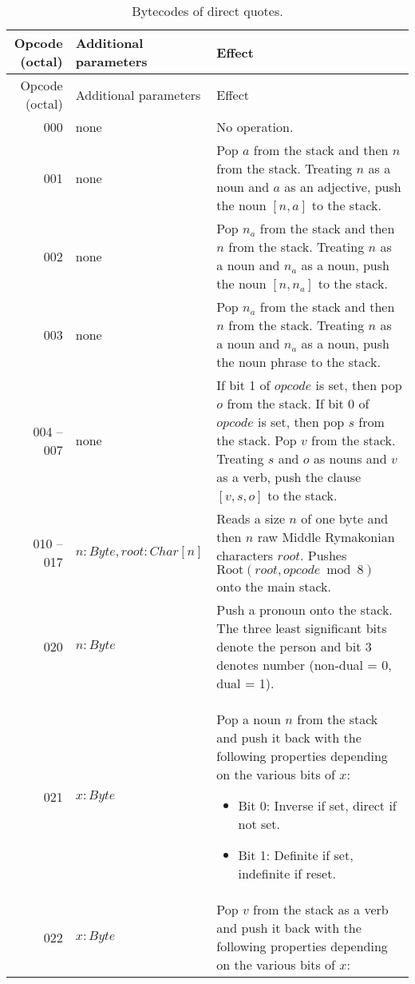 \documentclass{book}
\newcommand{\lname}{Middle Rymakonian}
\begin{document}
\begin{longtabu}[c]{r|l|Y}
    \caption{Bytecodes of direct quotes.} \\
    
    Opcode (octal) & Additional parameters & Effect \\
    \hline
    \endfirsthead
    
    Opcode (octal) & Additional parameters & Effect \\
    \hline
    \endhead
    
    \endfoot
    
    \endlastfoot

    000 & none & No operation. \\
    001 & none & Pop $a$ from the stack and then $n$ from the stack. Treating $n$ as a noun and $a$ as an adjective, push the noun $[n, a]$ to the stack. \\
    002 & none & Pop $n_a$ from the stack and then $n$ from the stack. Treating $n$ as a noun and $n_a$ as a noun, push the noun $[n, n_a]$ to the stack. \\
    003 & none & Pop $n_a$ from the stack and then $n$ from the stack. Treating $n$ as a noun and $n_a$ as a noun, push the noun phrase  to the stack. \\
    004 -- 007 & none & If bit 1 of $opcode$ is set, then pop $o$ from the stack. If bit 0 of $opcode$ is set, then pop $s$ from the stack. Pop $v$ from the stack. Treating $s$ and $o$ as nouns and $v$ as a verb, push the clause $[v, s, o]$ to the stack. \\
    010 -- 017 & $n : Byte, root: Char[n]$ & Reads a size $n$ of one byte and then $n$ raw \lname{} characters $root$. Pushes $\text{Root}(root, opcode \bmod 8)$ onto the main stack. \\
    020 & $n: Byte$ & Push a pronoun onto the stack. The three least significant bits denote the person and bit 3 denotes number (non-dual = 0, dual = 1). \\
    021 & $x: Byte$ & Pop a noun $n$ from the stack and push it back with the following properties depending on the various bits of $x$:
    \begin{itemize}
        \item Bit 0: Inverse if set, direct if not set.
        \item Bit 1: Definite if set, indefinite if reset.
    \end{itemize}
    \\
    022 & $x: Byte$ & Pop $v$ from the stack as a verb and push it back with the following properties depending on the various bits of $x$:

\end{longtabu}
\end{document}
